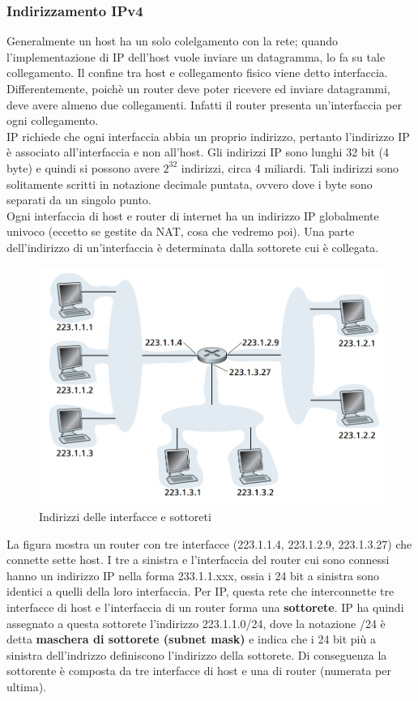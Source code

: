\documentclass[11pt,a4paper]{article}
\begin{document}
\subsubsection{Indirizzamento IPv4}
Generalmente un host ha un solo colelgamento con la rete; quando l'implementazione di IP dell'host vuole inviare un datagramma, lo fa su tale collegamento. Il confine tra host e collegamento fisico viene detto interfaccia. \\
Differentemente, poichè un router deve poter ricevere ed inviare datagrammi, deve avere almeno due collegamenti. Infatti il router presenta un'interfaccia per ogni collegamento. \\
IP richiede che ogni interfaccia abbia un proprio indirizzo, pertanto l'indirizzo IP è associato all'interfaccia e non all'host. Gli indirizzi IP sono lunghi 32 bit (4 byte) e quindi si possono avere $2^{32}$ indirizzi, circa 4 miliardi. Tali indirizzi sono solitamente scritti in notazione decimale puntata, ovvero dove i byte sono separati da un singolo punto. \\
Ogni interfaccia di host e router di internet ha un indirizzo IP globalmente univoco (eccetto se gestite da NAT, cosa che vedremo poi). Una parte dell'indirizzo di un'interfaccia è determinata dalla sottorete cui è collegata.
\begin{figure}
	\includegraphics[scale=0.6]{img/054.png}
	\caption{Indirizzi delle interfacce e sottoreti}
\end{figure}
La figura mostra un router con tre interfacce (223.1.1.4, 223.1.2.9, 223.1.3.27) che connette sette host. I tre a sinistra e l'interfaccia del router cui sono connessi hanno un indirizzo IP nella forma 233.1.1.xxx, ossia i 24 bit a sinistra sono identici a quelli della loro interfaccia. Per IP, questa rete che interconnette tre interfacce di host e l'interfaccia di un router forma una \textbf{sottorete}. IP ha quindi assegnato a questa sottorete l'indirizzo 223.1.1.0/24, dove la notazione /24 è detta \textbf{maschera di sottorete (subnet mask)} e indica che i 24 bit più a sinistra dell'indrizzo definiscono l'indirizzo della sottorete. Di conseguenza la sottorente è composta da tre interfacce di host e una di router (numerata per ultima). \\
\end{document}
